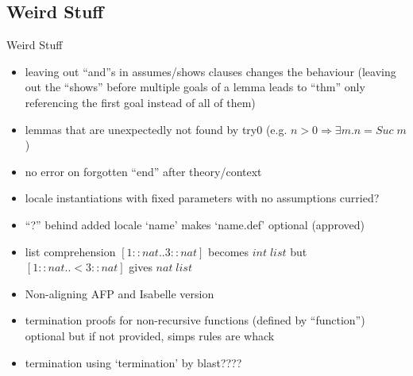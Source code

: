\documentclass[en,navbaroff]{afvbeamer}
\begin{document}
	\subsection{Weird Stuff}
	\begin{frame}{Weird Stuff}
		\begin{itemize}
			\item leaving out \enquote{and}s in assumes/shows clauses changes the behaviour (leaving out the \enquote{shows} before multiple goals of a lemma leads to \enquote{thm} only referencing the first goal instead of all of them)
			\item lemmas that are unexpectedly not found by try0 (e.g. $n > 0 \Rightarrow \exists m. n = Suc \; m$)
			\item no error on forgotten \enquote{end} after theory/context
			\item locale instantiations with fixed parameters with no assumptions curried?
			\item \enquote{?} behind added locale \enquote*{name} makes \enquote*{name.def} optional (approved)
			\item list comprehension $[1::nat..3::nat]$ becomes $int \; list$ but $[1::nat..<3::nat]$ gives $nat \; list$
			\item Non-aligning AFP and Isabelle version
			\item termination proofs for non-recursive functions (defined by \enquote{function}) optional but if not provided, simps rules are whack
			\item termination using \enquote*{termination} by blast????
		\end{itemize}
	\end{frame}
	
\end{document}

